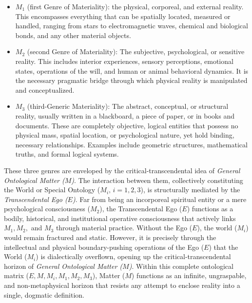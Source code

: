 \documentclass[11pt, a4paper]{article}
\begin{document}
\begin{itemize}
\item {$M_1$ (first Genre of Materiality):} the physical, corporeal, and external reality. This encompasses everything that can be spatially located, measured or handled, ranging from stars to electromagnetic waves, chemical and biological bonds, and any other material objects.

\item {$M_2$ (second Genre of Materiality):} The subjective, psychological, or sensitive reality. This includes interior experiences, sensory perceptions, emotional states, operations of the will, and human or animal behavioral dynamics. It is the necessary pragmatic bridge through which physical reality is manipulated and conceptualized.

\item {$M_3$ (third-Generic Materiality):} The abstract, conceptual, or structural reality, usually written in a blackboard, a piece of paper, or in books and documents. These are completely objective, logical entities that possess no physical mass, spatial location, or psychological nature, yet hold binding, necessary relationships. Examples include geometric structures, mathematical truths, and formal logical systems.
\end{itemize}

These three genres are enveloped by the critical-transcendental idea of \emph{General Ontological Matter ($M$)}. The interaction between them, collectively constituting the World or Special Ontology ($M_i,\, i=1,2,3$), is structurally mediated by the \emph{Transcendental Ego ($E$)}. Far from being an incorporeal spiritual entity or a mere psychological consciousness ($M_2$), the Transcendental Ego ($E$) functions as a bodily, historical, and institutional operative consciousness that actively links $M_1, M_2,$ and $M_3$ through material practice. Without the Ego ($E$), the world ($M_i$) would remain fractured and static. However, it is precisely through the intellectual and physical boundary-pushing operations of the Ego ($E$) that the World ($M_i$) is dialectically overflown, opening up the critical-transcendental horizon of \emph{General Ontological Matter ($M$)}. Within this complete ontological matrix ($E, M, M_i, M_1, M_2, M_3$), Matter ($M$) functions as an infinite, ungraspable, and non-metaphysical horizon that resists any attempt to enclose reality into a single, dogmatic definition.
\end{document}
